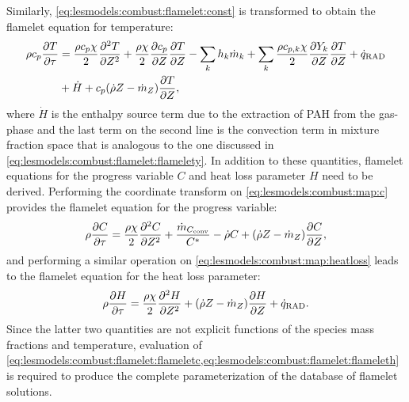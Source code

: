 Similarly, \cref{eq:lesmodels:combust:flamelet:const} is transformed to obtain the flamelet equation for temperature:
\begin{equation}\label{eq:lesmodels:combust:flamelet:flamelett}
  \begin{split}
    \rho c_p \pder[T]{\tau} &= \frac{\rho c_p \chi}{2}\sder[T]{Z} + \frac{\rho\chi}{2}\pder[c_p]{Z}\pder[T]{Z} - \sum\limits_{k} h_k\dot{m}_k + \sum\limits_{k} \frac{\rho c_{p,k}\chi}{2}\pder[Y_k]{Z}\pder[T]{Z} + \dot{q}_{\text{RAD}} \\
    &+ \dot{H} + c_p(\dot{\rho}Z - \dot{m}_Z)\pder[T]{Z},
  \end{split}
\end{equation}
where $\dot{H}$ is the enthalpy source term due to the extraction of PAH from the gas-phase and the last term on the second line is the convection term in mixture fraction space that is analogous to the one discussed in \cref{eq:lesmodels:combust:flamelet:flamelety}. In addition to these quantities, flamelet equations for the progress variable $C$ and heat loss parameter $H$ need to be derived. Performing the coordinate transform on \cref{eq:lesmodels:combust:map:c} provides the flamelet equation for the progress variable:
\begin{equation}\label{eq:lesmodels:combust:flamelet:flameletc}
  \rho\pder[C]{\tau} = \frac{\rho\chi}{2}\sder[C]{Z} + \frac{\dot{m}_{C_{\text{conv}}}}{C^*} - \dot{\rho}C + (\dot{\rho}Z - \dot{m}_Z)\pder[C]{Z},
\end{equation}
and performing a similar operation on \cref{eq:lesmodels:combust:map:heatloss} leads to the flamelet equation for the heat loss parameter:
\begin{equation}\label{eq:lesmodels:combust:flamelet:flameleth}
  \rho\pder[H]{\tau} = \frac{\rho\chi}{2}\sder[H]{Z} + (\dot{\rho}Z - \dot{m}_Z)\pder[H]{Z} + \dot{q}_{\text{RAD}}.
\end{equation}
Since the latter two quantities are not explicit functions of the species mass fractions and temperature, evaluation of \cref{eq:lesmodels:combust:flamelet:flameletc,eq:lesmodels:combust:flamelet:flameleth} is required to produce the complete parameterization of the database of flamelet solutions.

